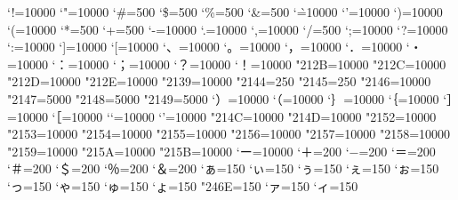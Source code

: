 \prebreakpenalty`!=10000
\prebreakpenalty`"=10000
\postbreakpenalty`\#=500
\postbreakpenalty`\$=500
\postbreakpenalty`\%=500
\postbreakpenalty`\&=500
\postbreakpenalty`\`=10000
\prebreakpenalty`'=10000
\prebreakpenalty`)=10000
\postbreakpenalty`(=10000
\prebreakpenalty`*=500
\prebreakpenalty`+=500
\prebreakpenalty`-=10000
\prebreakpenalty`.=10000
\prebreakpenalty`,=10000
\prebreakpenalty`/=500
\prebreakpenalty`;=10000
\prebreakpenalty`?=10000
\prebreakpenalty`:=10000
\prebreakpenalty`]=10000
\postbreakpenalty`[=10000
\prebreakpenalty`、=10000
\prebreakpenalty`。=10000
\prebreakpenalty`，=10000
\prebreakpenalty`．=10000
\prebreakpenalty`・=10000
\prebreakpenalty`：=10000
\prebreakpenalty`；=10000
\prebreakpenalty`？=10000
\prebreakpenalty`！=10000
\prebreakpenalty\jis"212B=10000
\prebreakpenalty\jis"212C=10000
\prebreakpenalty\jis"212D=10000
\postbreakpenalty\jis"212E=10000
\prebreakpenalty\jis"2139=10000
\prebreakpenalty\jis"2144=250
\prebreakpenalty\jis"2145=250
\postbreakpenalty\jis"2146=10000
\prebreakpenalty\jis"2147=5000
\postbreakpenalty\jis"2148=5000
\prebreakpenalty\jis"2149=5000
\prebreakpenalty`）=10000
\postbreakpenalty`（=10000
\prebreakpenalty`｝=10000
\postbreakpenalty`｛=10000
\prebreakpenalty`］=10000
\postbreakpenalty`［=10000
\postbreakpenalty`‘=10000
\prebreakpenalty`’=10000
\postbreakpenalty\jis"214C=10000
\prebreakpenalty\jis"214D=10000
\postbreakpenalty\jis"2152=10000
\prebreakpenalty\jis"2153=10000
\postbreakpenalty\jis"2154=10000
\prebreakpenalty\jis"2155=10000
\postbreakpenalty\jis"2156=10000
\prebreakpenalty\jis"2157=10000
\postbreakpenalty\jis"2158=10000
\prebreakpenalty\jis"2159=10000
\postbreakpenalty\jis"215A=10000
\prebreakpenalty\jis"215B=10000
\prebreakpenalty`ー=10000
\prebreakpenalty`＋=200
\prebreakpenalty`−=200
\prebreakpenalty`＝=200
\postbreakpenalty`＃=200
\postbreakpenalty`＄=200
\postbreakpenalty`％=200
\postbreakpenalty`＆=200
\prebreakpenalty`ぁ=150
\prebreakpenalty`ぃ=150
\prebreakpenalty`ぅ=150
\prebreakpenalty`ぇ=150
\prebreakpenalty`ぉ=150
\prebreakpenalty`っ=150
\prebreakpenalty`ゃ=150
\prebreakpenalty`ゅ=150
\prebreakpenalty`ょ=150
\prebreakpenalty\jis"246E=150
\prebreakpenalty`ァ=150
\prebreakpenalty`ィ=150
